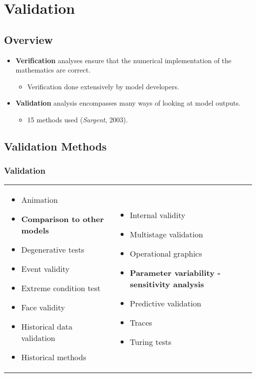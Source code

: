 \section{Validation}

\subsection{Overview}
\begin{frame}
	\begin{itemize}
	  \item \textbf{Verification} analyses ensure that the numerical implementation
	  of the mathematics are correct.
	  \begin{itemize}
	    \item Verification done extensively by model developers.
	  \end{itemize}
	  \item \textbf{Validation} analysis encompasses many ways of looking at model
	  outputs.
	  \begin{itemize}
	    \item 15 methods used (\textit{Sargent}, 2003).
	  \end{itemize}
	\end{itemize}
\end{frame}

\subsection{Validation Methods}
\begin{frame}
\frametitle{Validation}
\begin{tabular}{p{}p{}}
\begin{itemize}
  \item Animation
  \item \textbf{Comparison to other models}
  \item Degenerative tests
  \item Event validity
  \item Extreme condition test
  \item Face validity
  \item Historical data validation
  \item Historical methods
\end{itemize}&
\begin{itemize}
  \item Internal validity
  \item Multistage validation
  \item Operational graphics
  \item \textbf{Parameter variability - sensitivity analysis}
  \item Predictive validation
  \item Traces
  \item Turing tests
\end{itemize}
\end{tabular}
\end{frame}

